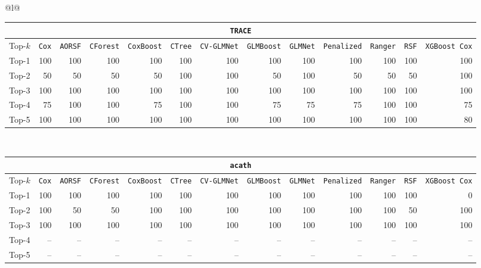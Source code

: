 \begin{longtable}{@{}l@{}}
\begin{tabular}{@{}l*{12}{r}@{}}
\multicolumn{13}{c}{\texttt{TRACE}} \\
\midrule
Top-$k$ & \texttt{Cox} & \texttt{AORSF} & \texttt{CForest} & \texttt{CoxBoost} & \texttt{CTree} & \texttt{CV-GLMNet} & \texttt{GLMBoost} & \texttt{GLMNet} & \texttt{Penalized} & \texttt{Ranger} & \texttt{RSF} & \texttt{XGBoost Cox} \\
\midrule
Top-1 & 100 & 100 & 100 & 100 & 100 & 100 & 100 & 100 & 100 & 100 & 100 & 100 \\
Top-2 & 50 & 50 & 50 & 50 & 100 & 100 & 50 & 100 & 50 & 50 & 50 & 100 \\
Top-3 & 100 & 100 & 100 & 100 & 100 & 100 & 100 & 100 & 100 & 100 & 100 & 100 \\
Top-4 & 75 & 100 & 100 & 75 & 100 & 100 & 75 & 75 & 75 & 100 & 100 & 75 \\
Top-5 & 100 & 100 & 100 & 100 & 100 & 100 & 100 & 100 & 100 & 100 & 100 & 80 \\
\end{tabular} \\
\midrule

\begin{tabular}{@{}l*{12}{r}@{}}
\multicolumn{13}{c}{\texttt{acath}} \\
\midrule
Top-$k$ & \texttt{Cox} & \texttt{AORSF} & \texttt{CForest} & \texttt{CoxBoost} & \texttt{CTree} & \texttt{CV-GLMNet} & \texttt{GLMBoost} & \texttt{GLMNet} & \texttt{Penalized} & \texttt{Ranger} & \texttt{RSF} & \texttt{XGBoost Cox} \\
\midrule
Top-1 & 100 & 100 & 100 & 100 & 100 & 100 & 100 & 100 & 100 & 100 & 100 & 0 \\
Top-2 & 100 & 50 & 50 & 100 & 100 & 100 & 100 & 100 & 100 & 100 & 50 & 100 \\
Top-3 & 100 & 100 & 100 & 100 & 100 & 100 & 100 & 100 & 100 & 100 & 100 & 100 \\
Top-4 & -- & -- & -- & -- & -- & -- & -- & -- & -- & -- & -- & -- \\
Top-5 & -- & -- & -- & -- & -- & -- & -- & -- & -- & -- & -- & -- \\
\end{tabular} \\
\midrule


\end{longtable}
